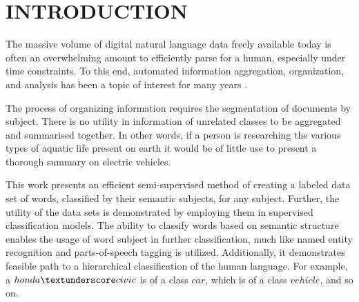 \documentclass[%
 reprint,
 amsmath,amssymb,
 aps,
]{revtex4-1}
\begin{document}

\section{\label{sec:level1}INTRODUCTION}


The massive volume of digital natural language data freely available today is often an overwhelming amount to efficiently parse for a human, especially under time constraints. To this end, automated information aggregation, organization, and analysis has been a topic of interest for many years \cite{Dumais_et_al,Morita_et_al}. 

The process of organizing information requires the segmentation of documents by subject. There is no utility in information of unrelated classes to be aggregated and summarised together. In other words, if a person is researching the various types of aquatic life present on earth it would be of little use to present a thorough summary on electric vehicles. 

This work presents an efficient semi-supervised method of creating a labeled data set of words, classified by their semantic subjects, for any subject. Further, the utility of the data sets is demonstrated by employing them in supervised classification models. The ability to classify words based on semantic structure enables the usage of word subject in further classification, much like named entity recognition and parts-of-speech tagging is utilized. Additionally, it demonstrates feasible path to a hierarchical classification of the human language. For example, a $honda \textunderscore civic$ is of a class $car$, which is of a class $vehicle$, and so on.


\end{document}
